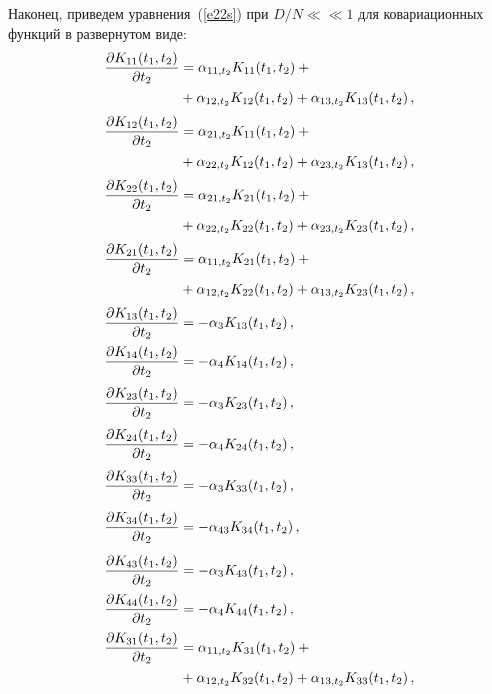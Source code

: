 \begin{multicols}{2}
Наконец, приведем уравнения~(\ref{e22s}) при $D/N \ll $\linebreak $\ll 1$ для
ковариационных функций в развернутом виде:
\begin{align*}
\displaystyle\frac{\displaystyle \partial K_{11} (t_1, t_2)\mathstrut}{\displaystyle  \partial t_2\mathstrut} & = \alpha_{11 , t_2} K_{11} (t_1, t_2)+{}\\
 &+ \alpha_{12, t_2} K_{12} (t_1, t_2) + \alpha_{13, t_2} K_{13} (t_1, t_2)\,,\notag\\[2pt]
\displaystyle\frac{\displaystyle \partial K_{12} (t_1, t_2)\mathstrut}{\displaystyle \partial t_2\mathstrut} &= \alpha_{21 , t_2} K_{11} (t_1, t_2)+{}\\
& + \alpha_{22, t_2} K_{12} (t_1, t_2) + \alpha_{23, t_2} K_{13} (t_1, t_2)\,,\notag\\[2pt]
\displaystyle\frac{\displaystyle \partial K_{22} (t_1, t_2)\mathstrut}{\displaystyle  \partial t_2\mathstrut} &= \alpha_{21 , t_2}K_{21} (t_1, t_2)+{}\\
& + \alpha_{22, t_2}K_{22} (t_1, t_2) + \alpha_{23, t_2} K_{23} (t_1, t_2) \,,\notag\\[2pt]
\displaystyle\frac{\displaystyle \partial K_{21} (t_1, t_2)\mathstrut}{\displaystyle \partial t_2\mathstrut}& = \alpha_{11 , t_2} K_{21} (t_1, t_2)+{}\\
& + \alpha_{12, t_2} K_{22} (t_1, t_2) + \alpha_{13, t_2} K_{23} (t_1, t_2)\,,\notag\\[2pt]
\displaystyle\frac{\displaystyle \partial K_{13} (t_1, t_2)\mathstrut}{\displaystyle \partial t_2\mathstrut}& =- \alpha_{3} K_{13} (t_1, t_2)\,,\\
\displaystyle\frac{\displaystyle \partial K_{14} (t_1, t_2)\mathstrut}{\displaystyle  \partial t_2\mathstrut} &=- \alpha_{4} K_{14} (t_1,  t_2)\,,\notag\\[2pt]
\displaystyle\frac{\displaystyle \partial K_{23} (t_1, t_2)\mathstrut}{\displaystyle \partial t_2\mathstrut} &=- \alpha_{3} K_{23} (t_1, t_2)\,,\\[2pt]
\displaystyle\frac{\displaystyle \partial K_{24} (t_1, t_2)\mathstrut}{\displaystyle \partial t_2\mathstrut} &=- \alpha_{4} K_{24} (t_1, t_2)\,,\notag\\[2pt]
\displaystyle\frac{\displaystyle \partial K_{33} (t_1, t_2)\mathstrut}{\displaystyle  \partial t_2\mathstrut}& =- \alpha_{3} K_{33} (t_1, t_2)\,,\\[2pt]
\displaystyle\frac{\displaystyle \partial K_{34} (t_1, t_2)\mathstrut}{\displaystyle  \partial t_2\mathstrut} &=- \alpha_{43} K_{34} (t_1, t_2)\,,\notag
 \end{align*}
 \begin{align*}
\fr{\partial K_{43} (t_1, t_2)}{ \partial t_2}& =- \alp_{3} K_{43} (t_1, t_2)\,,\\
\fr{\partial K_{44} (t_1, t_2)}{\partial t_2} &=- \alp_{4} K_{44} (t_1, t_2)\,,\notag\\
\fr{\partial K_{31} (t_1, t_2)}{\partial t_2}& = \alp_{11 , t_2} K_{31} (t_1, t_2)+{}\\
& + \alp_{12, t_2} K_{32} (t_1, t_2) + \alp_{13, t_2} K_{33} (t_1, t_2)\,,\notag\\

\end{align*}
\end{multicols}
